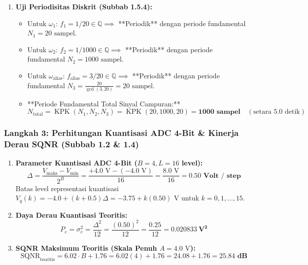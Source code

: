\documentclass[11pt,a4paper]{article}
\begin{document}
\begin{enumerate}[leftmargin=*]
  \item \textbf{Uji Periodisitas Diskrit (Subbab 1.5.4):}
  \begin{itemize}
    \item Untuk $\omega_1$: $f_1 = 1/20 \in \mathbb{Q} \implies$ **Periodik** dengan periode fundamental $N_1 = 20\text{ sampel}$.
    \item Untuk $\omega_2$: $f_2 = 1/1000 \in \mathbb{Q} \implies$ **Periodik** dengan periode fundamental $N_2 = 1000\text{ sampel}$.
    \item Untuk $\omega_{\text{alias}}$: $f_{\text{alias}} = 3/20 \in \mathbb{Q} \implies$ **Periodik** dengan periode fundamental $N_3 = \frac{20}{\gcd(3,20)} = 20\text{ sampel}$.
    \item **Periode Fundamental Total Sinyal Campuran:**
    \begin{equation}
    N_{\text{total}} = \operatorname{KPK}(N_1, N_2, N_3) = \operatorname{KPK}(20, 1000, 20) = \mathbf{1000\text{ sampel}} \quad (\text{setara } 5.0\text{ detik})
    \end{equation}
  \end{itemize}
\end{enumerate}

\newpage
\subsubsection{Langkah 3: Perhitungan Kuantisasi ADC 4-Bit \& Kinerja Derau SQNR (Subbab 1.2 \& 1.4)}
\begin{enumerate}[leftmargin=*]
  \item \textbf{Parameter Kuantisasi ADC 4-Bit ($B = 4, L = 16$ level):}
  \begin{equation}
  \Delta = \frac{V_{\text{maks}} - V_{\text{min}}}{2^B} = \frac{+4.0\text{ V} - (-4.0\text{ V})}{16} = \frac{8.0\text{ V}}{16} = \mathbf{0.50\text{ Volt / step}}
  \end{equation}
  Batas level representasi kuantisasi $V_q(k) = -4.0 + (k + 0.5)\Delta = -3.75 + k(0.50)\text{ V}$ untuk $k = 0, 1, \dots, 15$.
  \item \textbf{Daya Derau Kuantisasi Teoritis:}
  \begin{equation}
  P_e = \sigma_e^2 = \frac{\Delta^2}{12} = \frac{(0.50)^2}{12} = \frac{0.25}{12} = \mathbf{0.020833\ \text{V}^2}
  \end{equation}
  \item \textbf{SQNR Maksimum Teoritis (Skala Penuh $A = 4.0\text{ V}$):}
  \begin{equation}
  \text{SQNR}_{\text{teoritis}} = 6.02 \cdot B + 1.76 = 6.02(4) + 1.76 = 24.08 + 1.76 = \mathbf{25.84\text{ dB}}
  \end{equation}
\end{enumerate}
\end{document}
